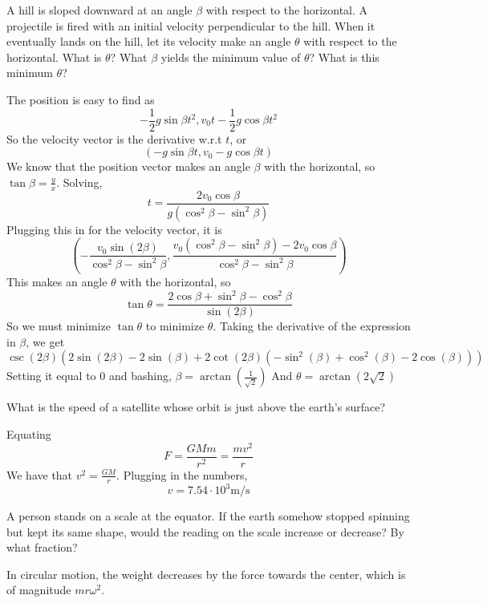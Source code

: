 \documentclass[11pt]{scrartcl}
\begin{document}
\begin{example}
  [3.51]
  A hill is sloped downward at an angle $\beta$ with respect to the horizontal.
  A projectile is fired with an initial velocity perpendicular to the hill.
  When it eventually lands on the hill, let its velocity make an angle $\theta$
  with respect to the horizontal. What is $\theta$? What $\beta$ yields the minimum
  value of $\theta$? What is this minimum $\theta$?
\end{example}
\begin{soln}
  The position is easy to find as
  $$-\frac{1}{2}g\sin\beta t^2, v_0t-\frac{1}{2}g\cos \beta t^2$$
  So the velocity vector is the derivative w.r.t $t$, or
  $$(-g\sin\beta t, v_0-g\cos\beta t)$$
  We know that the position vector makes an angle $\beta$ with the horizontal,
  so $\tan\beta=\frac{y}{x}$. Solving,
  $$t=\frac{2v_0\cos\beta}{g(\cos^2\beta-\sin^2\beta)}$$
  Plugging this in for the velocity vector, it is
  $$\left(-\frac{v_0\sin(2\beta)}{\cos^2\beta-\sin^2\beta}, \frac{v_0(\cos^2\beta-\sin^2\beta)-2v_0\cos\beta}{\cos^2\beta-\sin^2\beta}\right)$$
  This makes an angle $\theta$ with the horizontal, so
  $$\tan\theta=\frac{2\cos\beta+\sin^2\beta-\cos^2\beta}{\sin(2\beta)}$$
  So we must minimize $\tan\theta$ to minimize $\theta$. Taking the derivative
  of the expression in $\beta$, we get
  $$\csc(2\beta)(2\sin(2\beta)-2\sin(\beta)+2\cot(2\beta)(-\sin^2(\beta)+\cos^2(\beta)-2\cos(\beta)))$$
  Setting it equal to $0$ and bashing, $\beta=\arctan\left(\frac{1}{\sqrt{2}}\right)$
  And $\theta=\arctan(2\sqrt{2})$
\end{soln}
\begin{example}
  [3.54]
  What is the speed of a satellite whose orbit is just above the earth’s
  surface?
\end{example}
\begin{soln}
  Equating
  $$F=\frac{GMm}{r^2}=\frac{mv^2}{r}$$
  We have that $v^2=\frac{GM}{r}$. Plugging in the numbers,
  $$v=7.54\cdot 10^3\mathrm{m}/\mathrm{s}$$
\end{soln}
\begin{example}
  [3.55]
  A person stands on a scale at the equator. If the earth somehow stopped
  spinning but kept its same shape, would the reading on the scale increase
  or decrease? By what fraction?
\end{example}
\begin{soln}
  In circular motion, the weight decreases by the force towards the center,
  which is of magnitude $mr\omega^2$.
\end{soln}
\end{document}
